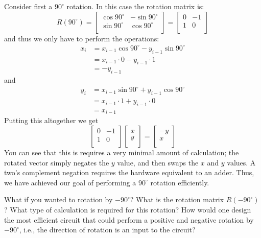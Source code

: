 Consider first a $90^\circ$ rotation. In this case the rotation matrix is:
\begin{equation}
R(90^\circ) = \begin{bmatrix}
\cos 90^\circ & -\sin 90^\circ \\
\sin 90^\circ & \cos 90^\circ \\
\end{bmatrix} = \begin{bmatrix}
0 & -1 \\
1 & 0 \\
\end{bmatrix} 
\end{equation} and thus we only have to perform the operations:
\begin{align}
x_i &= x_{i-1}  \cos 90^\circ - y_{i-1} \sin 90^\circ \nonumber \\
& = x_{i-1} \cdot 0 - y_{i-1} \cdot 1 \nonumber \\
& = -y_{i-1}\
\end{align}
and 
\begin{align}
y_i &= x_{i-1} \sin  90^\circ + y_{i-1} \cos 90^\circ \nonumber \\
& = x_{i-1} \cdot 1 + y_{i-1} \cdot 0 \nonumber \\
&=  x_{i-1}\
\end{align}
Putting this altogether we get
\begin{equation}
\begin{bmatrix}
0 & -1 \\
1 & 0 \\
\end{bmatrix}\begin{bmatrix}
x \\
y \\
\end{bmatrix}
= \begin{bmatrix}
-y \\
x \\
\end{bmatrix} 
\end{equation}
You can see that this is requires a very minimal amount of calculation; the rotated vector simply negates the $y$ value, and then swaps the $x$ and $y$ values. A two's complement negation requires the hardware equivalent to an adder. Thus, we have achieved our goal of performing a $90^\circ$ rotation efficiently.

\begin{exercise}
What if you wanted to rotation by $-90^\circ$? What is the rotation matrix $R(-90^\circ)$? What type of calculation is required for this rotation? How would one design the most efficient circuit that could perform a positive and negative rotation by $-90^\circ$, i.e., the direction of rotation is an input to the circuit?
\end{exercise}

